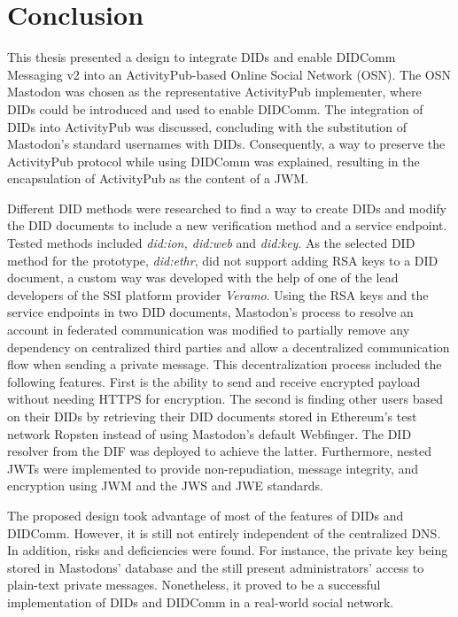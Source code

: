 \chapter{Conclusion}
\label{cha:conclusion}

This thesis presented a design to integrate DIDs and enable DIDComm Messaging v2 into an ActivityPub-based Online Social Network (OSN). The OSN Mastodon was chosen as the representative ActivityPub implementer, where DIDs could be introduced and used to enable DIDComm. 
The integration of DIDs into ActivityPub was discussed, concluding with the substitution of Mastodon's standard usernames with DIDs. Consequently, a way to preserve the ActivityPub protocol while using DIDComm was explained, resulting in the encapsulation of ActivityPub as the content of a JWM.

Different DID methods were researched to find a way to create DIDs and modify the DID documents to include a new verification method and a service endpoint. Tested methods included \emph{did:ion, did:web} and \emph{did:key}. As the selected DID method for the prototype, \emph{did:ethr}, did not support adding RSA keys to a DID document, a custom way was developed with the help of one of the lead developers of the SSI platform provider \emph{Veramo}.
Using the RSA keys and the service endpoints in two DID documents, Mastodon's process to resolve an account in federated communication was modified to partially remove any dependency on centralized third parties and allow a decentralized communication flow when sending a private message. This decentralization process included the following features. First is the ability to send and receive encrypted payload without needing HTTPS for encryption. The second is finding other users based on their DIDs by retrieving their DID documents stored in Ethereum's test network Ropsten instead of using Mastodon's default Webfinger. The DID resolver from the DIF was deployed to achieve the latter. Furthermore, nested JWTs were implemented to provide non-repudiation, message integrity, and encryption using JWM and the JWS and JWE standards.

The proposed design took advantage of most of the features of DIDs and DIDComm. However, it is still not entirely independent of the centralized DNS. In addition, risks and deficiencies were found. For instance, the private key being stored in Mastodons' database and the still present administrators' access to plain-text private messages. Nonetheless, it proved to be a successful implementation of DIDs and DIDComm in a real-world social network. 


